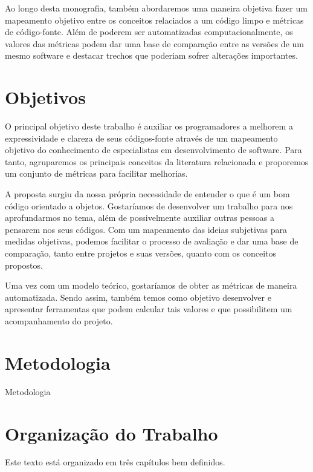 Ao longo desta monografia, também abordaremos uma maneira objetiva fazer um mapeamento objetivo 
entre os conceitos relaciados a um código limpo e métricas de código-fonte. Além de poderem ser
automatizadas computacionalmente, os valores das métricas podem dar uma base de comparação entre
as versões de um mesmo software e destacar trechos que poderiam sofrer alterações importantes.


\section{Objetivos}
\label{sec:objetivo}

O principal objetivo deste trabalho é auxiliar os programadores a melhorem a expressividade e clareza de seus códigos-fonte através de um mapeamento objetivo do conhecimento de especialistas em desenvolvimento de software. Para tanto, agruparemos os principais conceitos da literatura relacionada e proporemos um conjunto de métricas para facilitar melhorias.

A proposta surgiu da nossa própria necessidade de entender o que é um bom código orientado a objetos. Gostaríamos de desenvolver um trabalho para nos aprofundarmos no tema, além de possivelmente auxiliar outras pessoas a pensarem nos seus códigos. Com um mapeamento das ideias subjetivas para medidas objetivas, podemos facilitar o processo de avaliação e dar uma base de comparação, tanto entre projetos e suas versões, quanto com os conceitos propostos.

Uma vez com um modelo teórico, gostaríamos de obter as métricas de maneira automatizada. Sendo assim, também temos como objetivo desenvolver e apresentar ferramentas que podem calcular tais valores e que possibilitem um acompanhamento do projeto.


\section{Metodologia}
\label{sec:metodologia}

Metodologia

\section{Organização do Trabalho}
\label{sec:organizacao_trabalho}

Este texto está organizado em três capítulos bem definidos.

